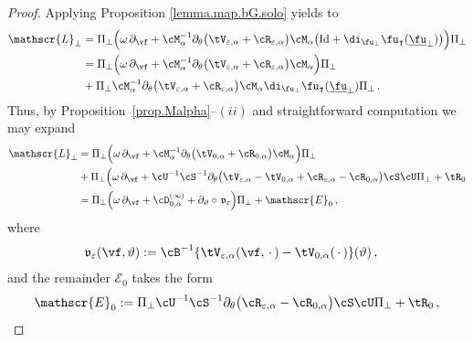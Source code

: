 \documentclass[a4paper,reqno,10pt]{article}
\newcommand{\pa}{\partial}
\newcommand{\sL}{\mathscr{L}}
\newcommand{\sE}{\mathscr{E}}
\newcommand{\fv}{\mathfrak{v}}
\begin{document}
\begin{proof}
	Applying Proposition \ref{lemma.map.bG.solo}  yields to
    \begin{align}
		\sL_{\perp} & = \Pi_{\perp} \Big(  \omega\,\pa_{\vf} +\cM_{\alpha}^{-1} \pa_{\theta} \big( \tV_{\varepsilon,\alpha}  + \cR_{\varepsilon,\alpha} \big) \cM_{\alpha} \big( {\rm Id} + \di_{\fu_{\perp}} \fu_{\intercal}(\underline{\fu}_{\perp}) \big)  \Big) \Pi_{\perp} \\
		& = \Pi_{\perp} \Big(  \omega\,\pa_{\vf} +\cM_{\alpha}^{-1} \pa_{\theta} \big( \tV_{\varepsilon,\alpha}  + \cR_{\varepsilon,\alpha} \big) \cM_{\alpha}   \Big) \Pi_{\perp}\\
        &+\Pi_{\perp}   \cM_{\alpha}^{-1} \pa_{\theta} \big( \tV_{\varepsilon,\alpha}  + \cR_{\varepsilon,\alpha} \big) \cM_{\alpha}   \di_{\fu_{\perp}} \fu_{\intercal}(\underline{\fu}_{\perp})    \Pi_{\perp}\,. 
	\end{align}
	Thus, by Proposition~\ref{prop.Malpha}--$(ii)$ and straightforward computation we may expand
	\begin{align}
		\sL_{\perp} 
		& = \Pi_{\perp} \Big(  \omega\,\pa_{\vf} +\cM_{\alpha}^{-1} \pa_{\theta} \big( \tV_{0,\alpha}  + \cR_{0,\alpha} \big) \cM_{\alpha}   \Big) \Pi_{\perp} \\
		& + \Pi_{\perp} \Big(  \omega\,\pa_{\vf} + \cU^{-1} \cS^{-1} \pa_{\theta} \big( \tV_{\varepsilon,\alpha} - \tV_{0,\alpha}  + \cR_{\varepsilon,\alpha} -\cR_{0,\alpha}\big) \cS \cU\Pi_{\perp} +  \tR_{0} \\
		&  = \Pi_{\perp} \Big(  \omega\,\pa_{\vf}  + \cD_{0,\alpha}^{(\infty)}+ \pa_{\vartheta} \circ\,\fv_{\varepsilon}\Big) \Pi_{\perp} +\sE_{0}\,,
	\end{align}
	where
	\begin{align}
		\fv_{\varepsilon}(\vf,\vartheta) & := \cB^{-1} \{ \tV_{\varepsilon,\alpha}(\vf,\,\cdot\,) - \tV_{0,\alpha}(\,\cdot\,)\}(\vartheta) \,, \label{fv.def} 
	\end{align}
	and the remainder $\sE_{0}$ takes the form
	\begin{equation}\label{sE0.def}
		\sE_{0} := \Pi_{\perp} \cU^{-1} \cS^{-1} \pa_{\theta} \big(\cR_{\varepsilon,\alpha} - \cR_{0,\alpha} \big) \cS \cU \Pi_{\perp} + \tR_{0}\,, 

\end{equation}
\end{proof}
\end{document}
